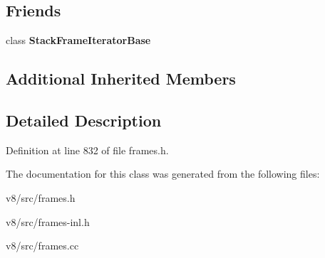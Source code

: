 \subsection*{Friends}
\begin{DoxyCompactItemize}
\item 
\mbox{\label{classv8_1_1internal_1_1InterpretedFrame_ac7310421866976ca454bbe11c5f926c3}} 
class {\bfseries Stack\+Frame\+Iterator\+Base}
\end{DoxyCompactItemize}
\subsection*{Additional Inherited Members}


\subsection{Detailed Description}


Definition at line 832 of file frames.\+h.



The documentation for this class was generated from the following files\+:\begin{DoxyCompactItemize}
\item 
v8/src/frames.\+h\item 
v8/src/frames-\/inl.\+h\item 
v8/src/frames.\+cc\end{DoxyCompactItemize}
